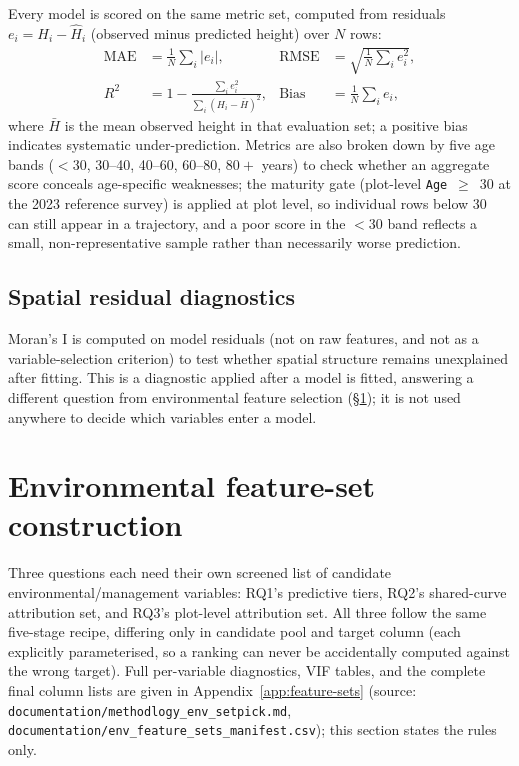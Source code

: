 \documentclass[11pt,a4paper]{report}
\begin{document}
Every model is scored on the same metric set, computed from residuals $e_i = H_i - \hat H_i$
(observed minus predicted height) over $N$ rows:
\begin{align*}
\text{MAE} &= \frac{1}{N}\sum_i |e_i|, &
\text{RMSE} &= \sqrt{\frac{1}{N}\sum_i e_i^2}, \\
R^2 &= 1 - \frac{\sum_i e_i^2}{\sum_i (H_i - \bar H)^2}, &
\text{Bias} &= \frac{1}{N}\sum_i e_i,
\end{align*}
where $\bar H$ is the mean observed height in that evaluation set; a positive bias indicates
systematic under-prediction. Metrics are also broken down by five age bands ($<30$, 30--40,
40--60, 60--80, $80+$ years) to check whether an aggregate score conceals age-specific weaknesses;
the maturity gate (plot-level \texttt{Age}~$\geq$~30 at the 2023 reference survey) is applied at
plot level, so individual rows below 30 can still appear in a trajectory, and a poor score in the
$<30$ band reflects a small, non-representative sample rather than necessarily worse prediction.

\subsection{Spatial residual diagnostics}

Moran's I is computed on model residuals (not on raw features, and not as a variable-selection
criterion) to test whether spatial structure remains unexplained after fitting. This is a
diagnostic applied after a model is fitted, answering a different question from environmental
feature selection (\S\ref{sec:feature-sets}); it is not used anywhere to decide which variables
enter a model.

\section{Environmental feature-set construction}
\label{sec:feature-sets}

Three questions each need their own screened list of candidate environmental/management
variables: RQ1's predictive tiers, RQ2's shared-curve attribution set, and RQ3's plot-level
attribution set. All three follow the same five-stage recipe, differing only in candidate pool
and target column (each explicitly parameterised, so a ranking can never be accidentally computed
against the wrong target). Full per-variable diagnostics, VIF tables, and the complete final
column lists are given in Appendix~\ref{app:feature-sets}
(source: \texttt{documentation/methodlogy\_env\_setpick.md},
\texttt{documentation/env\_feature\_sets\_manifest.csv}); this section states the rules only.
\end{document}
